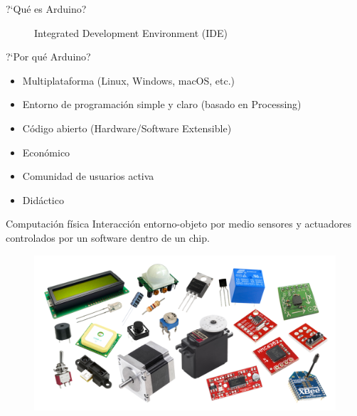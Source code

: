 \documentclass{beamer}
\begin{document}
\begin{frame}{?`Qué es Arduino?}
\begin{multicols}{2}
\begin{figure}
				\caption{Integrated Development Environment (IDE)}
			\end{figure}
		\end{multicols}
	\end{frame}
	
	\begin{frame}{?`Por qué Arduino?}
		\begin{itemize}
			\item Multiplataforma (Linux, Windows, macOS, etc.)
			\item Entorno de programación simple y claro (basado en Processing)
			\item Código abierto (Hardware/Software Extensible)
			\item Económico
			\item Comunidad de usuarios activa
			\item Didáctico
		\end{itemize}
	\end{frame}
	
	\begin{frame}{Computación física}
		Interacción entorno-objeto por medio sensores y actuadores controlados por un software dentro de un chip.
		\begin{figure}
			\centering
			\includegraphics[scale=0.25]{senact}
		\end{figure}
	\end{frame}
	
\end{document}
